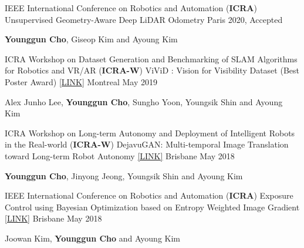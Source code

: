 \begin{cventries}

  \cventry
    {IEEE International Conference on Robotics and Automation (\textbf{ICRA})} %
    {Unsupervised Geometry-Aware Deep LiDAR Odometry} %
    {Paris} %
    {2020, Accepted} %
    {
      \begin{cvitems} %
        \item {\textbf{Younggun Cho}, Giseop Kim and Ayoung Kim}
      \end{cvitems}
    }

  \cventry
    {ICRA Workshop on Dataset Generation and Benchmarking of SLAM Algorithms for Robotics and VR/AR  (\textbf{ICRA-W})} %
    { ViViD : Vision for Visibility Dataset (Best Poster Award) \href{http://irap.kaist.ac.kr/index.php/Main/Publication?action=bibentry&bibfile=ref.bib&bibref=alee-2019-icra-ws}{[LINK]}} %
    {Montreal} %
    {May 2019} %
    {
      \begin{cvitems} %
        \item {Alex Junho Lee, \textbf{Younggun Cho}, Sungho Yoon, Youngsik Shin and Ayoung Kim}
      \end{cvitems}
    }

  \cventry
    {ICRA Workshop on Long-term Autonomy and Deployment of Intelligent Robots in the Real-world (\textbf{ICRA-W})} %
    {DejavuGAN: Multi-temporal Image Translation toward Long-term Robot Autonomy \href{http://irap.kaist.ac.kr/publications/ycho-2018-icraws.pdf}{[LINK]}} %
    {Brisbane} %
    {May 2018} %
    {
      \begin{cvitems} %
        \item {\textbf{Younggun Cho}, Jinyong Jeong, Youngsik Shin and Ayoung Kim}
      \end{cvitems}
    }

  \cventry
    {IEEE International Conference on Robotics and Automation (\textbf{ICRA})} %
    {Exposure Control using Bayesian Optimization based on Entropy Weighted Image Gradient \href{http://irap.kaist.ac.kr/publications/jwkim-2018-icra.pdf}{[LINK]}} %
    {Brisbane} %
    {May 2018} %
    {
      \begin{cvitems} %
        \item {Joowan Kim, \textbf{Younggun Cho} and Ayoung Kim}
      \end{cvitems}
    }



\end{cventries}
